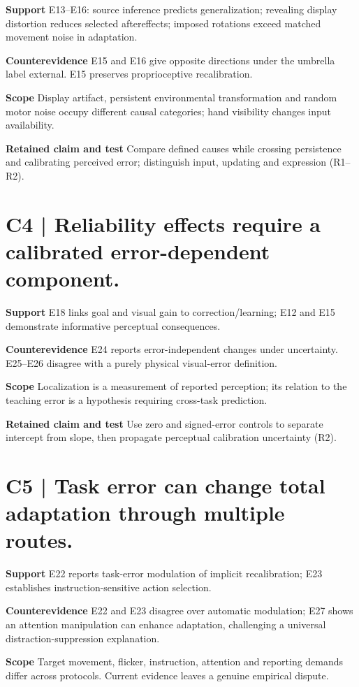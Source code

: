 \documentclass[11pt,a4paper]{article}
\begin{document}
\textbf{Support} E13--E16: source inference predicts generalization; revealing display distortion reduces selected aftereffects; imposed rotations exceed matched movement noise in adaptation.\par
\textbf{Counterevidence} E15 and E16 give opposite directions under the umbrella label external. E15 preserves proprioceptive recalibration.\par
\textbf{Scope} Display artifact, persistent environmental transformation and random motor noise occupy different causal categories; hand visibility changes input availability.\par
\textbf{Retained claim and test} Compare defined causes while crossing persistence and calibrating perceived error; distinguish input, updating and expression (R1--R2).\par
\medskip\section{C4 | Reliability effects require a calibrated error-dependent component.}
\textbf{Support} E18 links goal and visual gain to correction/learning; E12 and E15 demonstrate informative perceptual consequences.\par
\textbf{Counterevidence} E24 reports error-independent changes under uncertainty. E25--E26 disagree with a purely physical visual-error definition.\par
\textbf{Scope} Localization is a measurement of reported perception; its relation to the teaching error is a hypothesis requiring cross-task prediction.\par
\textbf{Retained claim and test} Use zero and signed-error controls to separate intercept from slope, then propagate perceptual calibration uncertainty (R2).\par
\clearpage\section{C5 | Task error can change total adaptation through multiple routes.}
\textbf{Support} E22 reports task-error modulation of implicit recalibration; E23 establishes instruction-sensitive action selection.\par
\textbf{Counterevidence} E22 and E23 disagree over automatic modulation; E27 shows an attention manipulation can enhance adaptation, challenging a universal distraction-suppression explanation.\par
\textbf{Scope} Target movement, flicker, instruction, attention and reporting demands differ across protocols. Current evidence leaves a genuine empirical dispute.\par
\end{document}
